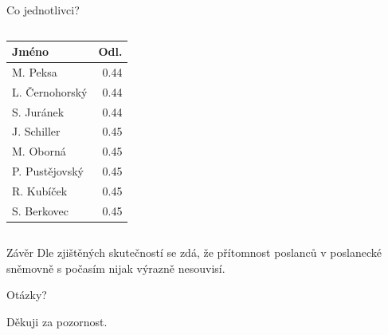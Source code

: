 \documentclass[10pt]{beamer}
\begin{document}
\begin{frame}{Co jednotlivci?}
\begin{columns}
        \begin{column}{0.33\textwidth}
            \centering\begin{tabular}{lr}
                \hline
                Jméno &        Odl. \\
                \hline
                M. Peksa      &  0.44 \\
                L. Černohorský  &  0.44 \\
                S. Juránek  &  0.44 \\
                J. Schiller       &  0.45 \\
                M. Oborná      &  0.45 \\
                P. Pustějovský  &  0.45 \\
                R. Kubíček      &  0.45 \\
                S. Berkovec &  0.45 
            \end{tabular}
        \end{column}
    \end{columns}
    \endgroup
\end{frame}

\begin{frame}{Závěr}
    Dle zjištěných skutečností se zdá, že přítomnost poslanců v poslanecké sněmovně s počasím nijak výrazně nesouvisí.
\end{frame}

{
\begin{frame}[standout]
  Otázky?
\end{frame}
}

\appendix

{
\begin{frame}[standout]
  Děkuji za pozornost.
\end{frame}
}
\end{document}
